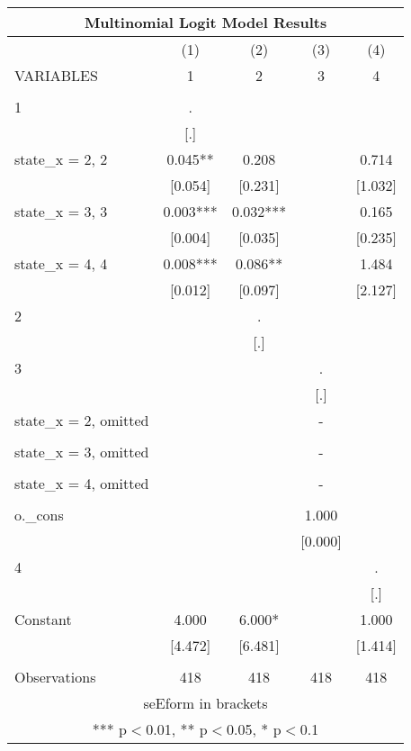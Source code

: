 \documentclass[]{article}
\begin{document}
\begin{tabular}{lcccc}
\multicolumn{5}{c}{Multinomial Logit Model Results} \\ \hline
 & (1) & (2) & (3) & (4) \\
VARIABLES & 1 & 2 & 3 & 4 \\ \hline
 &  &  &  &  \\
1 & . &  &  &  \\
 & [.] &  &  &  \\
state\_x = 2, 2 & 0.045** & 0.208 &  & 0.714 \\
 & [0.054] & [0.231] &  & [1.032] \\
state\_x = 3, 3 & 0.003*** & 0.032*** &  & 0.165 \\
 & [0.004] & [0.035] &  & [0.235] \\
state\_x = 4, 4 & 0.008*** & 0.086** &  & 1.484 \\
 & [0.012] & [0.097] &  & [2.127] \\
2 &  & . &  &  \\
 &  & [.] &  &  \\
3 &  &  & . &  \\
 &  &  & [.] &  \\
state\_x = 2, omitted &  &  & - &  \\
 &  &  &  &  \\
state\_x = 3, omitted &  &  & - &  \\
 &  &  &  &  \\
state\_x = 4, omitted &  &  & - &  \\
 &  &  &  &  \\
o.\_cons &  &  & 1.000 &  \\
 &  &  & [0.000] &  \\
4 &  &  &  & . \\
 &  &  &  & [.] \\
Constant & 4.000 & 6.000* &  & 1.000 \\
 & [4.472] & [6.481] &  & [1.414] \\
 &  &  &  &  \\
 Observations & 418 & 418 & 418 & 418 \\ \hline
\multicolumn{5}{c}{ seEform in brackets} \\
\multicolumn{5}{c}{ *** p$<$0.01, ** p$<$0.05, * p$<$0.1} \\
\end{tabular}
\end{document}
